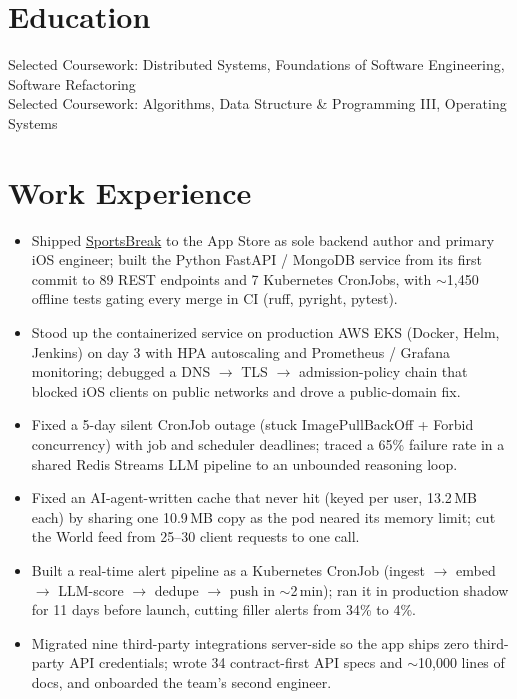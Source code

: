 \documentclass[11pt, letterpaper]{article}
\begin{document}

\section{Education}
Selected Coursework: Distributed Systems, Foundations of Software Engineering, Software Refactoring\\[1pt]
Selected Coursework: Algorithms, Data Structure \& Programming III, Operating Systems

\section{Work Experience}
\begin{itemize}
  \item Shipped \href{https://apps.apple.com/app/id6762649287}{SportsBreak} to the App Store as sole backend author and primary iOS engineer; built the Python FastAPI / MongoDB service from its first commit to 89 REST endpoints and 7 Kubernetes CronJobs, with $\sim$1{,}450 offline tests gating every merge in CI (ruff, pyright, pytest).
  \item Stood up the containerized service on production AWS EKS (Docker, Helm, Jenkins) on day 3 with HPA autoscaling and Prometheus / Grafana monitoring; debugged a DNS $\to$ TLS $\to$ admission-policy chain that blocked iOS clients on public networks and drove a public-domain fix.
  \item Fixed a 5-day silent CronJob outage (stuck ImagePullBackOff + Forbid concurrency) with job and scheduler deadlines; traced a 65\% failure rate in a shared Redis Streams LLM pipeline to an unbounded reasoning loop.
  \item Fixed an AI-agent-written cache that never hit (keyed per user, 13.2\,MB each) by sharing one 10.9\,MB copy as the pod neared its memory limit; cut the World feed from 25--30 client requests to one call.
  \item Built a real-time alert pipeline as a Kubernetes CronJob (ingest $\to$ embed $\to$ LLM-score $\to$ dedupe $\to$ push in $\sim$2\,min); ran it in production shadow for 11 days before launch, cutting filler alerts from 34\% to 4\%.
  \item Migrated nine third-party integrations server-side so the app ships zero third-party API credentials; wrote 34 contract-first API specs and $\sim$10{,}000 lines of docs, and onboarded the team's second engineer.
\end{itemize}
\end{document}
